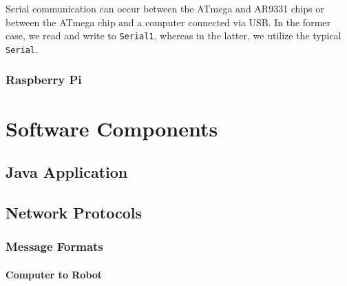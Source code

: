 \documentclass[letterpaper,12pt]{article}
\begin{document}
Serial communication can occur between the ATmega and AR9331 chips or between
the ATmega chip and a computer connected via USB. In the former case, we read
and write to \texttt{Serial1}, whereas in the latter, we utilize the typical
\texttt{Serial}.


\subsubsection{Raspberry Pi}

\section{Software Components}
\subsection{Java Application}

\subsection{Network Protocols}

\subsubsection{Message Formats}

\paragraph{Computer to Robot}
\label{sec:comp_robot_msg}
\end{document}
